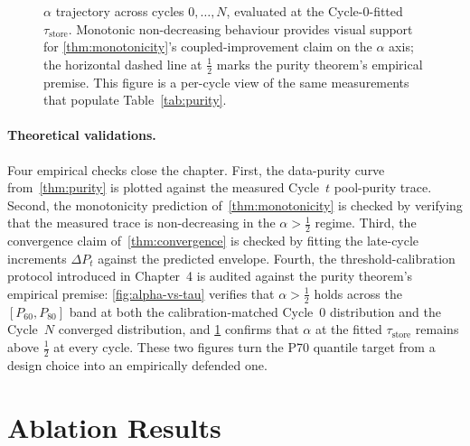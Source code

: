 \begin{figure}[t]
\centering
{}
\caption{$\alpha$ trajectory across cycles $0, \ldots, N$, evaluated
at the Cycle-0-fitted $\tau_{\text{store}}$. Monotonic non-decreasing
behaviour provides visual support for \cref{thm:monotonicity}'s
coupled-improvement claim on the $\alpha$ axis; the horizontal dashed
line at $\tfrac{1}{2}$ marks the purity theorem's empirical premise.
This figure is a per-cycle view of the same measurements that
populate Table~\ref{tab:purity}.}
\label{fig:alpha-trajectory}
\end{figure}

\paragraph{Theoretical validations.} Four empirical checks close the
chapter. First, the data-purity curve from~\cref{thm:purity} is plotted
against the measured Cycle~$t$ pool-purity trace. Second, the
monotonicity prediction of~\cref{thm:monotonicity} is checked by
verifying that the measured trace is non-decreasing in the
$\alpha > \tfrac{1}{2}$ regime. Third, the convergence claim
of~\cref{thm:convergence} is checked by fitting the late-cycle
increments $\Delta P_t$ against the predicted envelope. Fourth, the
threshold-calibration protocol introduced in Chapter~4 is audited
against the purity theorem's empirical premise: \cref{fig:alpha-vs-tau}
verifies that $\alpha > \tfrac{1}{2}$ holds across the
$[P_{60}, P_{80}]$ band at both the calibration-matched Cycle~0
distribution and the Cycle~$N$ converged distribution, and
\cref{fig:alpha-trajectory} confirms that $\alpha$ at the fitted
$\tau_{\text{store}}$ remains above $\tfrac{1}{2}$ at every cycle.
These two figures turn the P70 quantile target from a design choice
into an empirically defended one.

\section{Ablation Results}
\label{sec:ablation-results}

